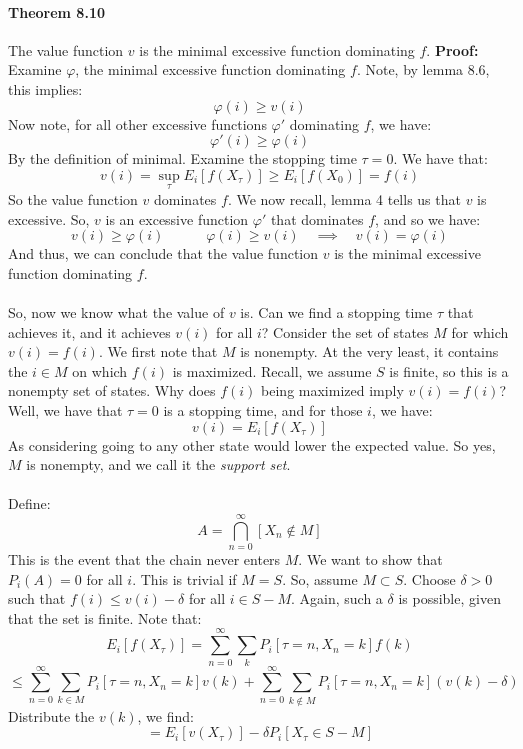 \documentclass[12pt,a4paper]{article}
\newcommand{\1}[1]{\mathbbm{1}\left\{ #1 \right\}}
\begin{document}
\paragraph{Theorem 8.10} The value function $v$ is the minimal excessive function dominating $f$. \textbf{Proof:} Examine $\varphi$, the minimal excessive function dominating $f$. Note, by lemma 8.6, this implies:
$$
	\varphi(i) \geq v(i)
$$
Now note, for all other excessive functions $\varphi'$ dominating $f$, we have:
$$
	\varphi'(i) \geq \varphi(i)
$$
By the definition of minimal. Examine the stopping time $\tau = 0$. We have that:
$$
	v(i) = \sup_\tau E_i\left[f(X_\tau)\right] \geq 
	E_i\left[f(X_0)\right] = f(i)
$$
So the value function $v$ dominates $f$. We now recall, lemma 4 tells us that $v$ is excessive. So, $v$ is an excessive function $\varphi'$ that dominates $f$, and so we have:
$$
	v(i) \geq \varphi(i) \quad\quad\quad
	\varphi(i) \geq v(i) \quad\implies\quad
	v(i) = \varphi(i)
$$
And thus, we can conclude that the value function $v$ is the minimal excessive function dominating $f$.
\\\\
So, now we know what the value of $v$ is. Can we find a stopping time $\tau$ that achieves it, and it achieves $v(i)$ for all $i$? Consider the set of states $M$ for which $v(i) = f(i)$. We first note that $M$ is nonempty. At the very least, it contains the $i \in M$ on which $f(i)$ is maximized. Recall, we assume $S$ is finite, so this is a nonempty set of states. Why does $f(i)$ being maximized imply $v(i) = f(i)$? Well, we have that $\tau = 0$ is a stopping time, and for those $i$, we have:
$$
	v(i) = E_i\left[f(X_\tau)\right]
$$
As considering going to any other state would lower the expected value. So yes, $M$ is nonempty, and we call it the \textit{support set}.
\\\\
Define:
$$
	A = \bigcap_{n=0}^\infty \left[X_n \not\in M\right]
$$
This is the event that the chain never enters $M$. We want to show that $P_i(A) = 0$ for all $i$. This is trivial if $M = S$. So, assume $M \subset S$. Choose $\delta > 0$ such that $f(i) \leq v(i) - \delta$ for all $i \in S - M$. Again, such a $\delta$ is possible, given that the set is finite. Note that:
$$
	E_i\left[f(X_\tau)\right] =
	\sum_{n=0}^\infty \sum_k P_i\left[\tau = n, X_n = k\right]f(k) 
$$
$$
	\leq
	\sum_{n=0}^\infty \sum_{k \in M} P_i\left[\tau = n, X_n = k\right]v(k) +
	\sum_{n=0}^\infty \sum_{k \not\in M} P_i\left[\tau = n, X_n = k\right](v(k) - \delta)
$$
Distribute the $v(k)$, we find:
$$
	= E_i\left[v(X_\tau)\right] - \delta P_i\left[X_\tau \in S - M\right]
$$
\end{document}
